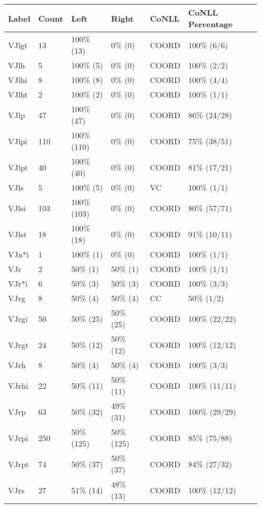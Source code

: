 \begin{figure*}
\begin{tabular}{|l|l|l|l||l|l|}
\hline
Label & Count & Left & Right & CoNLL & CoNLL Percentage\\ 
\hline
 VJlgt & 13 & 100\% (13) & 0\% (0) & COORD & 100\% (6/6) \\ 
\hline
 VJlh & 5 & 100\% (5) & 0\% (0) & COORD & 100\% (2/2) \\ 
\hline
 VJlhi & 8 & 100\% (8) & 0\% (0) & COORD & 100\% (4/4) \\ 
\hline
 VJlht & 2 & 100\% (2) & 0\% (0) & COORD & 100\% (1/1) \\ 
\hline
 VJlp & 47 & 100\% (47) & 0\% (0) & COORD & 86\% (24/28) \\ 
\hline
 VJlpi & 110 & 100\% (110) & 0\% (0) & COORD & 75\% (38/51) \\ 
\hline
 VJlpt & 40 & 100\% (40) & 0\% (0) & COORD & 81\% (17/21) \\ 
\hline
 VJls & 5 & 100\% (5) & 0\% (0) & VC & 100\% (1/1) \\ 
\hline
 VJlsi & 103 & 100\% (103) & 0\% (0) & COORD & 80\% (57/71) \\ 
\hline
 VJlst & 18 & 100\% (18) & 0\% (0) & COORD & 91\% (10/11) \\ 
\hline
 VJn*i & 1 & 100\% (1) & 0\% (0) & COORD & 100\% (1/1) \\ 
\hline
 VJr & 2 & 50\% (1) & 50\% (1) & COORD & 100\% (1/1) \\ 
\hline
 VJr*i & 6 & 50\% (3) & 50\% (3) & COORD & 100\% (3/3) \\ 
\hline
 VJrg & 8 & 50\% (4) & 50\% (4) & CC & 50\% (1/2) \\ 
\hline
 VJrgi & 50 & 50\% (25) & 50\% (25) & COORD & 100\% (22/22) \\ 
\hline
 VJrgt & 24 & 50\% (12) & 50\% (12) & COORD & 100\% (12/12) \\ 
\hline
 VJrh & 8 & 50\% (4) & 50\% (4) & COORD & 100\% (3/3) \\ 
\hline
 VJrhi & 22 & 50\% (11) & 50\% (11) & COORD & 100\% (11/11) \\ 
\hline
 VJrp & 63 & 50\% (32) & 49\% (31) & COORD & 100\% (29/29) \\ 
\hline
 VJrpi & 250 & 50\% (125) & 50\% (125) & COORD & 85\% (75/88) \\ 
\hline
 VJrpt & 74 & 50\% (37) & 50\% (37) & COORD & 84\% (27/32) \\ 
\hline
 VJrs & 27 & 51\% (14) & 48\% (13) & COORD & 100\% (12/12) \\ 

\end{tabular}
\end{figure*}
